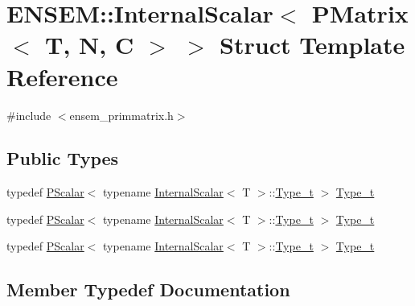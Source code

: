 \hypertarget{structENSEM_1_1InternalScalar_3_01PMatrix_3_01T_00_01N_00_01C_01_4_01_4}{}\section{E\+N\+S\+EM\+:\+:Internal\+Scalar$<$ P\+Matrix$<$ T, N, C $>$ $>$ Struct Template Reference}
\label{structENSEM_1_1InternalScalar_3_01PMatrix_3_01T_00_01N_00_01C_01_4_01_4}


{\ttfamily \#include $<$ensem\+\_\+primmatrix.\+h$>$}

\subsection*{Public Types}
\begin{DoxyCompactItemize}
\item 
typedef \mbox{\hyperlink{classENSEM_1_1PScalar}{P\+Scalar}}$<$ typename \mbox{\hyperlink{structENSEM_1_1InternalScalar}{Internal\+Scalar}}$<$ T $>$\+::\mbox{\hyperlink{structENSEM_1_1InternalScalar_3_01PMatrix_3_01T_00_01N_00_01C_01_4_01_4_a8f6d0ab798cf3ec250a72a2bc706c676}{Type\+\_\+t}} $>$ \mbox{\hyperlink{structENSEM_1_1InternalScalar_3_01PMatrix_3_01T_00_01N_00_01C_01_4_01_4_a8f6d0ab798cf3ec250a72a2bc706c676}{Type\+\_\+t}}
\item 
typedef \mbox{\hyperlink{classENSEM_1_1PScalar}{P\+Scalar}}$<$ typename \mbox{\hyperlink{structENSEM_1_1InternalScalar}{Internal\+Scalar}}$<$ T $>$\+::\mbox{\hyperlink{structENSEM_1_1InternalScalar_3_01PMatrix_3_01T_00_01N_00_01C_01_4_01_4_a8f6d0ab798cf3ec250a72a2bc706c676}{Type\+\_\+t}} $>$ \mbox{\hyperlink{structENSEM_1_1InternalScalar_3_01PMatrix_3_01T_00_01N_00_01C_01_4_01_4_a8f6d0ab798cf3ec250a72a2bc706c676}{Type\+\_\+t}}
\item 
typedef \mbox{\hyperlink{classENSEM_1_1PScalar}{P\+Scalar}}$<$ typename \mbox{\hyperlink{structENSEM_1_1InternalScalar}{Internal\+Scalar}}$<$ T $>$\+::\mbox{\hyperlink{structENSEM_1_1InternalScalar_3_01PMatrix_3_01T_00_01N_00_01C_01_4_01_4_a8f6d0ab798cf3ec250a72a2bc706c676}{Type\+\_\+t}} $>$ \mbox{\hyperlink{structENSEM_1_1InternalScalar_3_01PMatrix_3_01T_00_01N_00_01C_01_4_01_4_a8f6d0ab798cf3ec250a72a2bc706c676}{Type\+\_\+t}}
\end{DoxyCompactItemize}


\subsection{Member Typedef Documentation}
\mbox{\label{structENSEM_1_1InternalScalar_3_01PMatrix_3_01T_00_01N_00_01C_01_4_01_4_a8f6d0ab798cf3ec250a72a2bc706c676}} 
